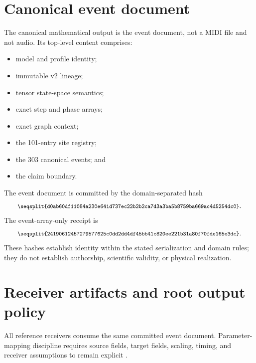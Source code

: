 \documentclass[11pt,a4paper]{article}
\theoremstyle{definition}
\newcommand{\hash}[1]{\texttt{\footnotesize\seqsplit{#1}}}
\begin{document}
\section{Canonical event document}
The canonical mathematical output is the event document, not a MIDI file and not audio. Its top-level content comprises:
\begin{itemize}
\item model and profile identity;
\item immutable v2 lineage;
\item tensor state-space semantics;
\item exact step and phase arrays;
\item exact graph context;
\item the 101-entry site registry;
\item the 303 canonical events; and
\item the claim boundary.
\end{itemize}

The event document is committed by the domain-separated hash
\begin{equation}
\hash{d0ab60df11084a230e641d737ec22b2b2ca7d3a3ba5b8759ba669ac4d5254dc0}.
\end{equation}
The event-array-only receipt is
\begin{equation}
\hash{24190612457279577625c0dd2dd4df45bb41c820ee221b31a80f70fde165e3dc}.
\end{equation}
These hashes establish identity within the stated serialization and domain rules; they do not establish authorship, scientific validity, or physical realization.

\section{Receiver artifacts and root output policy}
All reference receivers consume the same committed event document. Parameter-mapping discipline requires source fields, target fields, scaling, timing, and receiver assumptions to remain explicit \cite{grond2011parameter}.
\end{document}
